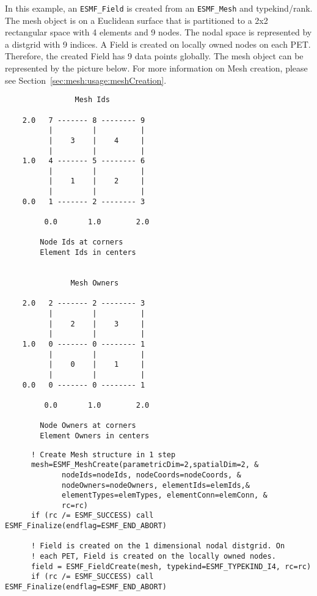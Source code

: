    In this example, an {\tt ESMF\_Field} is created from an {\tt ESMF\_Mesh} 
   and typekind/rank.
   The mesh object is on a Euclidean surface that is partitioned to a 2x2 rectangular
   space with 4 elements and 9 nodes. The nodal space is represented by
   a distgrid with 9 indices. A Field is created on locally owned nodes on each PET.
   Therefore, the created Field has 9 data points globally.
   The mesh object can be represented by the picture
   below. For more information on Mesh creation, please see Section~\ref{sec:mesh:usage:meshCreation}.
   \begin{verbatim}
                Mesh Ids
  
    2.0   7 ------- 8 -------- 9
          |         |          |
          |    3    |    4     |
          |         |          |
    1.0   4 ------- 5 -------- 6
          |         |          |
          |    1    |    2     |
          |         |          |
    0.0   1 ------- 2 -------- 3
  
         0.0       1.0        2.0 
  
        Node Ids at corners
        Element Ids in centers
   
  
               Mesh Owners
  
    2.0   2 ------- 2 -------- 3
          |         |          |
          |    2    |    3     |
          |         |          |
    1.0   0 ------- 0 -------- 1
          |         |          |
          |    0    |    1     |
          |         |          |
    0.0   0 ------- 0 -------- 1
  
         0.0       1.0        2.0 
  
        Node Owners at corners
        Element Owners in centers
  \end{verbatim} 
   

 \begin{verbatim}
      ! Create Mesh structure in 1 step
      mesh=ESMF_MeshCreate(parametricDim=2,spatialDim=2, &
             nodeIds=nodeIds, nodeCoords=nodeCoords, &
             nodeOwners=nodeOwners, elementIds=elemIds,&
             elementTypes=elemTypes, elementConn=elemConn, &
             rc=rc)
      if (rc /= ESMF_SUCCESS) call ESMF_Finalize(endflag=ESMF_END_ABORT)

      ! Field is created on the 1 dimensional nodal distgrid. On
      ! each PET, Field is created on the locally owned nodes.
      field = ESMF_FieldCreate(mesh, typekind=ESMF_TYPEKIND_I4, rc=rc)
      if (rc /= ESMF_SUCCESS) call ESMF_Finalize(endflag=ESMF_END_ABORT)
 
\end{verbatim}
 
